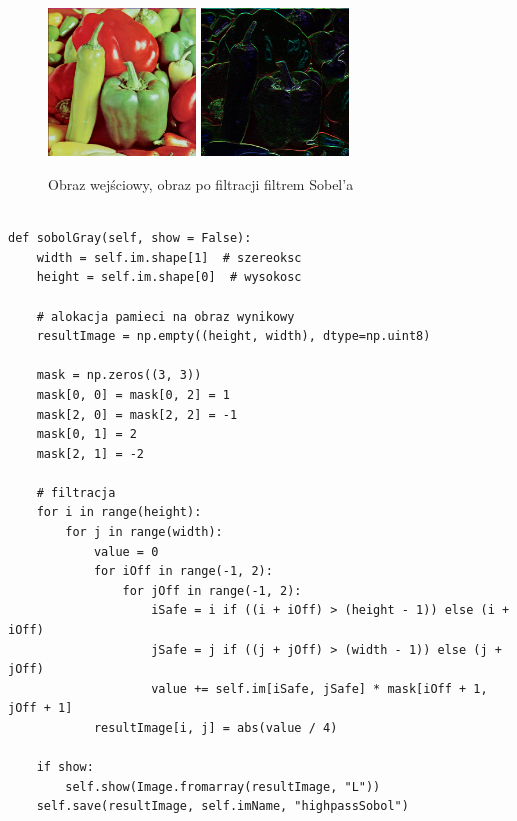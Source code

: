 \documentclass[final,a4paper,openany,12pt]{mwbk}
\begin{document}
\begin{figure}[H]
	\begin{center}
		\includegraphics[width=0.35\textwidth]{peppers_color}
		\includegraphics[width=0.35\textwidth]{peppers_color_highpassSobol_result}
	\end{center}
	\caption{Obraz wejściowy, obraz po filtracji filtrem Sobel'a}
\end{figure}
\newpage


\begin{lstlisting}[caption=Operator Sobel'a (obraz szary)]
	
def sobolGray(self, show = False):
	width = self.im.shape[1]  # szereoksc
	height = self.im.shape[0]  # wysokosc
	
	# alokacja pamieci na obraz wynikowy
	resultImage = np.empty((height, width), dtype=np.uint8)
	
	mask = np.zeros((3, 3))
	mask[0, 0] = mask[0, 2] = 1
	mask[2, 0] = mask[2, 2] = -1
	mask[0, 1] = 2
	mask[2, 1] = -2
	
	# filtracja
	for i in range(height):
		for j in range(width):
			value = 0
			for iOff in range(-1, 2):
				for jOff in range(-1, 2):
					iSafe = i if ((i + iOff) > (height - 1)) else (i + iOff)
					jSafe = j if ((j + jOff) > (width - 1)) else (j + jOff)
					value += self.im[iSafe, jSafe] * mask[iOff + 1, jOff + 1]
			resultImage[i, j] = abs(value / 4)
	
	if show:
		self.show(Image.fromarray(resultImage, "L"))
	self.save(resultImage, self.imName, "highpassSobol")
	
\end{lstlisting}
\end{document}
